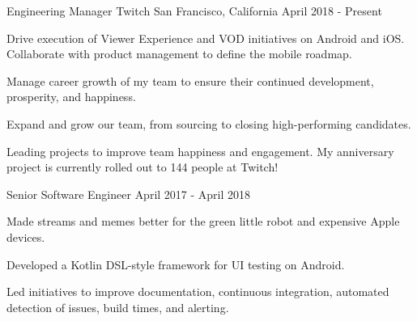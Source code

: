 

\begin{cventries}

  \cventry
    {Engineering Manager} %
    {Twitch} %
    {San Francisco, California} %
    {April 2018 - Present} %
    {
	\begin{cvitems} %
      	\item Drive execution of Viewer Experience and VOD initiatives on Android and iOS. Collaborate with product management to define the mobile roadmap.
      	\item Manage career growth of my team to ensure their continued development, prosperity, and happiness.
      	\item Expand and grow our team, from sourcing to closing high-performing candidates.
      	\item Leading projects to improve team happiness and engagement. My anniversary project is currently rolled out to 144 people at Twitch!
	\end{cvitems}
    }
    
  \cventry
    {Senior Software Engineer} %
    {} %
    {} %
    {April 2017 - April 2018} %
    {
	\begin{cvitems} %
      	\item Made streams and memes better for the green little robot and expensive Apple devices. 
      	\item Developed a Kotlin DSL-style framework for UI testing on Android. 
      	\item Led initiatives to improve documentation, continuous integration, automated detection of issues, build times, and alerting.
	\end{cvitems}
    }


\end{cventries}
